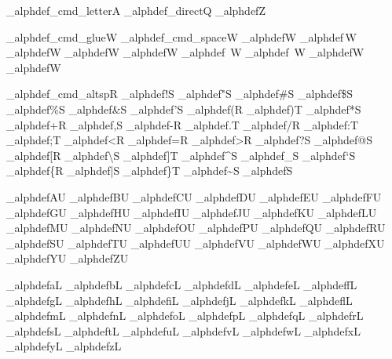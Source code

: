 \brl@info_alphdef{\brl@text_cmd_letter}{A}%
\brl@info_alphdef{\brl@char@cmd_direct}{Q}
\brl@info_alphdef{\brl@end}{Z}

\brl@info_alphdef{\brl@text_cmd_glue}{W}%
\brl@info_alphdef{\brl@text_cmd_space}{W}
\brl@info_alphdef{\!}{W}
\brl@info_alphdef{\,}{W}
\brl@info_alphdef{\>}{W}
\brl@info_alphdef{\:}{W}
\brl@info_alphdef{\;}{W}
\brl@info_alphdef{\ }{W}
\brl@info_alphdef{~}{W}
\brl@info_alphdef{\quad}{W}
\brl@info_alphdef{\qquad}{W}

\brl@info_alphdef{\brl@info_cmd_altsp}{R}%
\brl@info_alphdef{!}{S}%
\brl@info_alphdef{"}{S}%
\brl@info_alphdef{\#}{S}%
\brl@info_alphdef{\$}{S}%
\brl@info_alphdef{\%}{S}%
\brl@info_alphdef{\&}{S}%
\brl@info_alphdef{'}{S}%
\brl@info_alphdef{(}{R}%
\brl@info_alphdef{)}{T}%
\brl@info_alphdef{*}{S}%
\brl@info_alphdef{+}{R}%
\brl@info_alphdef{,}{S}%
\brl@info_alphdef{-}{R}%
\brl@info_alphdef{.}{T}%
\brl@info_alphdef{/}{R}%
\brl@info_alphdef{:}{T}%
\brl@info_alphdef{;}{T}%
\brl@info_alphdef{<}{R}%
\brl@info_alphdef{=}{R}%
\brl@info_alphdef{>}{R}%
\brl@info_alphdef{?}{S}%
\brl@info_alphdef{@}{S}%
\brl@info_alphdef{[}{R}%
\brl@info_alphdef{\textbackslash}{S}%
\brl@info_alphdef{]}{T}%
\brl@info_alphdef{\textasciicircum}{S}%
\brl@info_alphdef{\_}{S}%
\brl@info_alphdef{`}{S}%
\brl@info_alphdef{\{}{R}%
\brl@info_alphdef{|}{S}%
\brl@info_alphdef{\}}{T}%
\brl@info_alphdef{\textasciitilde}{S}%
%
\brl@info_alphdef{\yen}{S}%


\brl@info_alphdef{A}{U}
\brl@info_alphdef{B}{U}
\brl@info_alphdef{C}{U}
\brl@info_alphdef{D}{U}
\brl@info_alphdef{E}{U}
\brl@info_alphdef{F}{U}
\brl@info_alphdef{G}{U}
\brl@info_alphdef{H}{U}
\brl@info_alphdef{I}{U}
\brl@info_alphdef{J}{U}
\brl@info_alphdef{K}{U}
\brl@info_alphdef{L}{U}
\brl@info_alphdef{M}{U}
\brl@info_alphdef{N}{U}
\brl@info_alphdef{O}{U}
\brl@info_alphdef{P}{U}
\brl@info_alphdef{Q}{U}
\brl@info_alphdef{R}{U}
\brl@info_alphdef{S}{U}
\brl@info_alphdef{T}{U}
\brl@info_alphdef{U}{U}
\brl@info_alphdef{V}{U}
\brl@info_alphdef{W}{U}
\brl@info_alphdef{X}{U}
\brl@info_alphdef{Y}{U}
\brl@info_alphdef{Z}{U}

\brl@info_alphdef{a}{L}
\brl@info_alphdef{b}{L}
\brl@info_alphdef{c}{L}
\brl@info_alphdef{d}{L}
\brl@info_alphdef{e}{L}
\brl@info_alphdef{f}{L}
\brl@info_alphdef{g}{L}
\brl@info_alphdef{h}{L}
\brl@info_alphdef{i}{L}
\brl@info_alphdef{j}{L}
\brl@info_alphdef{k}{L}
\brl@info_alphdef{l}{L}
\brl@info_alphdef{m}{L}
\brl@info_alphdef{n}{L}
\brl@info_alphdef{o}{L}
\brl@info_alphdef{p}{L}
\brl@info_alphdef{q}{L}
\brl@info_alphdef{r}{L}
\brl@info_alphdef{s}{L}
\brl@info_alphdef{t}{L}
\brl@info_alphdef{u}{L}
\brl@info_alphdef{v}{L}
\brl@info_alphdef{w}{L}
\brl@info_alphdef{x}{L}
\brl@info_alphdef{y}{L}
\brl@info_alphdef{z}{L}

